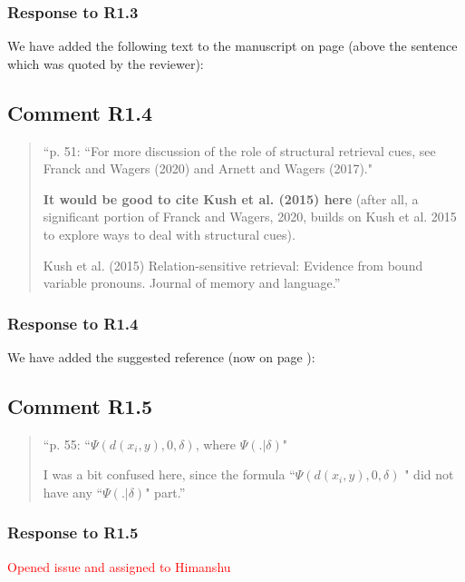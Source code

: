 \documentclass[12pt]{article}
\begin{document}
\subsubsection*{Response to R1.3}
We have added the following text to the manuscript on page \pageref{confound} (above the sentence which was quoted by the reviewer):

\begin{quote}
\end{quote}


\subsection*{Comment R1.4}
\begin{quote}
``p. 51: ``For more discussion of the role of structural retrieval cues, see Franck and Wagers (2020) and Arnett and Wagers (2017)."

\textbf{It would be good to cite Kush et al. (2015) here} (after all, a significant portion of Franck and Wagers, 2020, builds on Kush et al. 2015 to explore ways to deal with structural cues).

Kush et al. (2015) Relation-sensitive retrieval: Evidence from bound variable pronouns. Journal of memory and language.''
\end{quote}
\subsubsection*{Response to R1.4}
We have added the suggested reference (now on page \pageref{cite_kush}):

\begin{quote}
\end{quote}



\subsection*{Comment R1.5}
\begin{quote}
``p. 55: ``$\Psi(d(x_i, y), 0 , \delta)$, where $\Psi(.|\delta)$"

I was a bit confused here, since the formula  ``$\Psi(d(x_i, y), 0 , \delta)$ " did not have any  ``$\Psi(.|\delta)$" part.''
\end{quote}

\subsubsection*{Response to R1.5}
\textcolor{red}{Opened issue and assigned to Himanshu}
\end{document}
